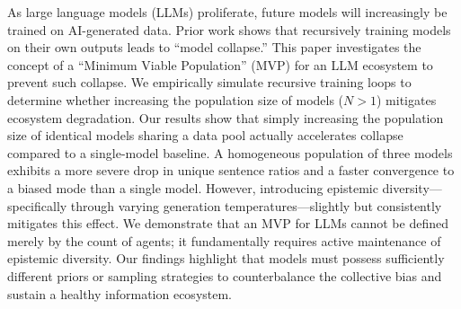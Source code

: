 As large language models (LLMs) proliferate, future models will increasingly be trained on AI-generated data. Prior work shows that recursively training models on their own outputs leads to ``model collapse.'' This paper investigates the concept of a ``Minimum Viable Population'' (MVP) for an LLM ecosystem to prevent such collapse. We empirically simulate recursive training loops to determine whether increasing the population size of models ($N > 1$) mitigates ecosystem degradation. Our results show that simply increasing the population size of identical models sharing a data pool actually accelerates collapse compared to a single-model baseline. A homogeneous population of three models exhibits a more severe drop in unique sentence ratios and a faster convergence to a biased mode than a single model. However, introducing epistemic diversity---specifically through varying generation temperatures---slightly but consistently mitigates this effect. We demonstrate that an MVP for LLMs cannot be defined merely by the count of agents; it fundamentally requires active maintenance of epistemic diversity. Our findings highlight that models must possess sufficiently different priors or sampling strategies to counterbalance the collective bias and sustain a healthy information ecosystem.